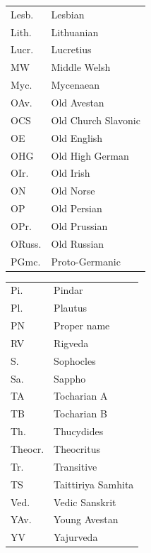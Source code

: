 \documentclass[output=paper,colorlinks,citecolor=brown]{langscibook}
\begin{document}
\begin{tabularx}{.45\textwidth}{lQ}
Lesb. & Lesbian \\
Lith.\ & Lithuanian \\
Lucr. & Lucretius \\
MW & Middle Welsh \\
Myc. & Mycenaean \\
OAv. & Old Avestan \\
OCS & Old Church Slavonic \\
OE & Old English \\
OHG & Old High German \\
OIr. & Old Irish \\
ON & Old Norse \\
OP & Old Persian\\
OPr.\ & Old Prussian \\
ORuss. & Old Russian \\
PGmc. & Proto-Germanic \\
\end{tabularx}
\begin{tabularx}{.45\textwidth}{lQ}
Pi. & Pindar \\
Pl. & Plautus \\
PN & Proper name \\
RV & Rigveda \\
S. & Sophocles \\
Sa. & Sappho \\
TA & Tocharian A \\
TB & Tocharian B \\
Th. & Thucydides \\
Theocr. & Theocritus \\
Tr. & Transitive \\
TS & Taittiriya Samhita \\
Ved. & Vedic Sanskrit \\
YAv. & Young Avestan \\
YV & Yajurveda \\
\end{tabularx}



{\sloppy\printbibliography[heading=subbibliography,notkeyword=this]}
\end{document}
